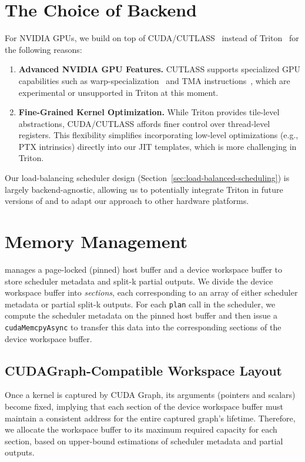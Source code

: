 \section{The Choice of Backend}
\label{sec:backend-choice}

For NVIDIA GPUs, we build \sys on top of CUDA/CUTLASS~\cite{cutlass} instead of Triton~\cite{triton} for the following reasons:
\begin{enumerate}
    \item \textbf{Advanced NVIDIA GPU Features.} CUTLASS supports specialized GPU capabilities such as warp-specialization~\cite{warp-specialization} and TMA instructions~\cite{hopper-tma}, which are experimental or unsupported in Triton at this moment.
    \item \textbf{Fine-Grained Kernel Optimization.} While Triton provides tile-level abstractions, CUDA/CUTLASS affords finer control over thread-level registers. This flexibility simplifies incorporating low-level optimizations (e.g., PTX intrinsics) directly into our JIT templates, which is more challenging in Triton.
\end{enumerate}

Our load-balancing scheduler design (Section~\ref{sec:load-balanced-scheduling}) is largely backend-agnostic, allowing us to potentially integrate Triton in future versions of \sys and to adapt our approach to other hardware platforms.

\section{Memory Management}
\label{sec:memory-mgmt}

\sys manages a page-locked (pinned) host buffer and a device workspace buffer to store scheduler metadata and split-k partial outputs. We divide the device workspace buffer into \emph{sections}, each corresponding to an array of either scheduler metadata or partial split-k outputs. For each \lstinline{plan} call in the scheduler, we compute the scheduler metadata on the pinned host buffer and then issue a \lstinline{cudaMemcpyAsync} to transfer this data into the corresponding sections of the device workspace buffer.

\subsection{CUDAGraph-Compatible Workspace Layout}
\label{sec:cudagraph-compatible-layout}

Once a kernel is captured by CUDA Graph, its arguments (pointers and scalars) become fixed, implying that each section of the device workspace buffer must maintain a consistent address for the entire captured graph's lifetime. Therefore, we allocate the workspace buffer to its maximum required capacity for each section, based on upper-bound estimations of scheduler metadata and partial outputs.

